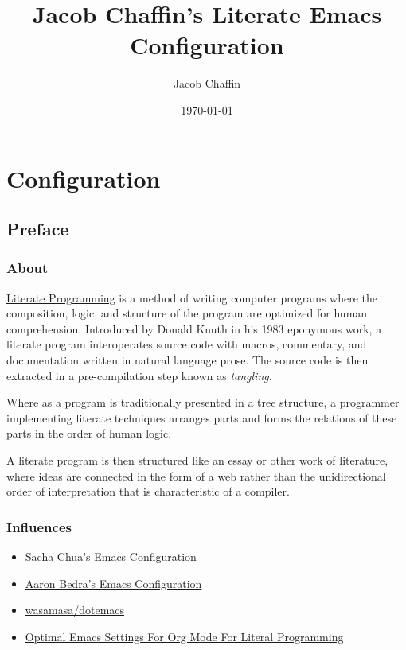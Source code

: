 \documentclass[11pt]{article}
\author{Jacob Chaffin}
\date{\today}
\title{Jacob Chaffin's Literate Emacs Configuration}
\begin{document}
\maketitle

\section*{Configuration}
\label{sec:org2d10916}
\subsection*{Preface}
\label{sec:org6bca3c0}
\subsubsection*{About}
\label{sec:org9e2ff35}

\href{https://en.wikipedia.org/wiki/literate\_programming}{Literate Programming} is a method of writing computer programs where
the composition, logic, and structure of the program are optimized for
human comprehension. Introduced by Donald Knuth in his 1983 eponymous
work, a literate program interoperates source code with macros,
commentary, and documentation written in natural language prose. The
source code is then extracted in a pre-compilation step known as
\emph{tangling}.

Where as a program is traditionally presented in a tree structure, a
programmer implementing literate techniques arranges parts and forms
the relations of these parts in the order of human logic.

A literate program is then structured like an essay or other work of
literature, where ideas are connected in the form of a web rather than
the unidirectional order of interpretation that is characteristic of a
compiler.

\subsubsection*{Influences}
\label{sec:org3c95bef}

\begin{itemize}
\item \href{http://pages.sachachua.com/.emacs.d/sacha.html}{Sacha Chua's Emacs Configuration}
\item \href{http://aaronbedra.com/emacs.d/}{Aaron Bedra's Emacs Configuration}
\item \href{https://github.com/Wasamasa/dotemacs/blob/master/init.org}{wasamasa/dotemacs}
\item \href{http://fgiasson.com/blog/index.php/2016/06/21/optimal-emacs-settings-for-org-mode-for-literate-programming/}{Optimal Emacs Settings For Org Mode For Literal Programming}
\end{itemize}
\end{document}
